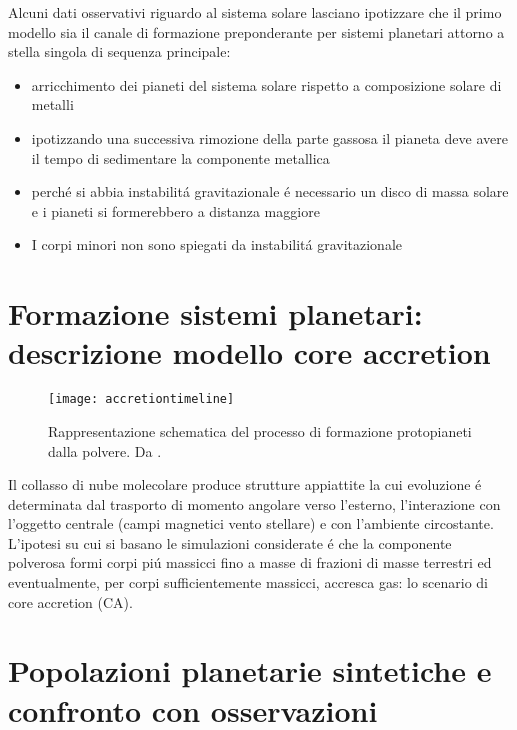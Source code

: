 \documentclass[twoside,11pt,fleqn]{memoir}%
\begin{document}
Alcuni dati osservativi riguardo al sistema solare lasciano ipotizzare che il primo modello sia il canale di formazione preponderante per sistemi planetari attorno a stella singola di sequenza principale:
\begin{itemize}
\item arricchimento dei pianeti del sistema solare rispetto a composizione solare di metalli%
\item ipotizzando una successiva rimozione della parte gassosa il pianeta deve avere il tempo di sedimentare la componente metallica
\item perch\'e si abbia instabilit\'a gravitazionale \'e necessario un disco di massa solare e i pianeti si formerebbero a distanza maggiore
\item I corpi minori non sono spiegati da instabilit\'a gravitazionale
\end{itemize}


\cleartorecto

{\let\clearpage\relax\let\cleardoublepage\relax
\part{Formazione sistemi planetari: descrizione modello core accretion}\label{part:CAdesc}
}
\begin{figure}[!ht]
\texttt{[image: accretiontimeline]}\caption{Rappresentazione schematica del processo di formazione protopianeti dalla polvere. Da \cite{perryman2011exoplanet}.}\label{fig:accretiontimeline}
\end{figure}
Il collasso di nube molecolare produce strutture appiattite la cui evoluzione \'e determinata dal trasporto di momento angolare verso l'esterno, l'interazione con l'oggetto centrale (campi magnetici vento stellare) e con l'ambiente circostante.
L'ipotesi su cui si basano le simulazioni considerate \'e che la componente polverosa formi corpi pi\'u massicci fino a masse di frazioni di masse terrestri  ed eventualmente, per corpi sufficientemente massicci, accresca gas: lo scenario di core accretion (CA).

\cleartorecto

{\let\clearpage\relax\let\cleardoublepage\relax
\part{Popolazioni planetarie sintetiche e confronto con osservazioni}
}
\end{document}
